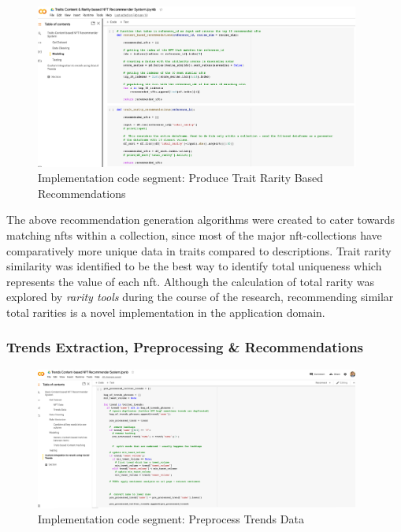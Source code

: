 \begin{figure}[h!]
\centering
\includegraphics[width=0.95\textwidth]{images/Implementation/code/trait-rarity recommendations.png}
\caption{Implementation code segment: Produce Trait Rarity Based Recommendations}
\label{fig:code-trait-rarity-rec}
\end{figure}

The above recommendation generation algorithms were created to cater towards matching \gls{nft}s within a collection, since most of the major \gls{nft}-collections have comparatively more unique data in traits compared to descriptions. Trait rarity similarity was identified to be the best way to identify total uniqueness which represents the value of each \gls{nft}. Although the calculation of total rarity was explored by \textit{rarity tools} during the course of the research, recommending similar total rarities is a novel implementation in the application domain.

\subsubsection{Trends Extraction, Preprocessing \& Recommendations}
\begin{figure}[h!]
\centering
\includegraphics[width=0.95\textwidth]{images/Implementation/code/preprocessing trends.png}
\caption{Implementation code segment: Preprocess Trends Data}
\label{fig:code-preprocess-trends}
\end{figure}

